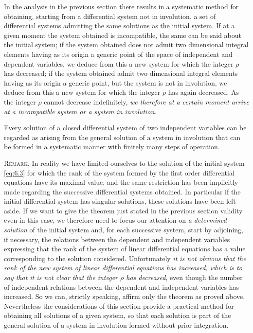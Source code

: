 \vspace{12pt}\fsec In the analysis in the previous section there results in a systematic method for obtaining, starting from a differential system not in involution, a set of differential systems admitting the same solutions as the initial system. If at a given moment the system obtained is incompatible, the same can be said about the initial system; if the system obtained does not admit two dimensional integral elements having as its origin a generic point of the space of independent and dependent variables, we deduce from this a new system for which the integer $\rho$ has decreased; if the system obtained admit two dimensional integral elements having as its origin a generic point, but the system is not in involution, we deduce from this a new system for which the integer $\rho$ has again decreased. As the integer $\rho$ cannot decrease indefinitely, \emph{we therefore at a certain moment arrive at a incompatible system or a system in involution.}
\begin{thm*}
  Every solution of a closed differential system of two independent variables can be regarded as arising from the general solution of a system in involution that can be formed in a systematic manner with finitely many steps of operation.
\end{thm*}



\vspace{12pt}\fsec\textsc{Remark.} In reality we have limited ourselves to the solution of the initial system \eqref{eq:6.3} for which the rank of the  system formed by the first order differential equations have its maximal value, and the same restriction has been implicitly made regarding the successive differential systems obtained. In particular if the initial differential system has singular solutions, these solutions have been left aside. If we want to give the theorem just stated in the previous section validity even in this case, we therefore need to focus our attention on \emph{a determined solution} of the initial system and, for each successive system, start by adjoining, if necessary, the relations between the dependent and independent variables expressing that the rank of the system of linear differential equations has a value corresponding to the solution considered. Unfortunately \emph{it is not obvious that the rank of the new system of linear differential equations has increased, which is to say that it is not clear that the integer $\rho$ has decreased}, even though the number of independent relations between the dependent and independent variables has increased. So we can, strictly speaking, affirm only the theorem as proved above. Nevertheless the considerations of this section provide a practical method for obtaining all solutions of a given system, so that each solution is part of the general solution of a system in involution formed without prior integration.

